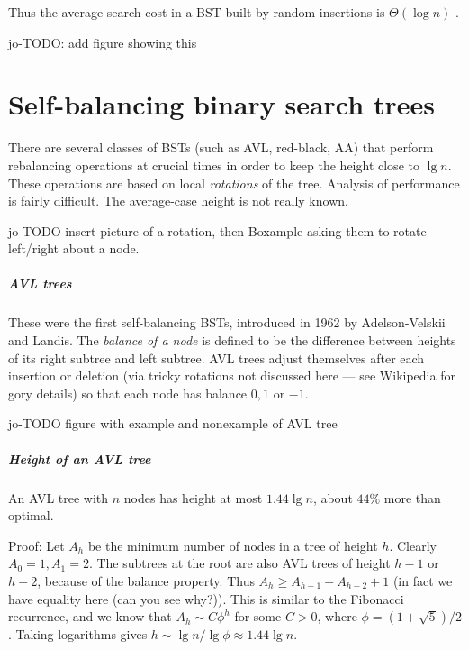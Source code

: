 Thus the average search cost in a BST built by random insertions is $\Theta(\log n)$ .

jo-TODO: add figure showing this





\chapter{Self-balancing binary search trees} %
\label{sec:balanced}

There are several classes of BSTs (such as AVL, red-black, AA) that 
perform rebalancing operations at crucial times in order to keep the height 
close to $\lg n$.
These operations are based on local \emph{rotations} of the tree.
Analysis of performance is fairly difficult.
The average-case height is not really known.

jo-TODO insert picture of a rotation, then Boxample asking them to rotate left/right about a node.

\paragraph{AVL trees}

These were the first self-balancing BSTs, introduced in 1962 by 
Adelson-Velskii and Landis. The \emph{balance of a node} is defined to be the difference between heights of its 
right subtree and left subtree. AVL trees adjust themselves after each insertion 
or deletion (via tricky rotations not discussed here --- see Wikipedia for gory details) so that each node has balance $0, 1$ or $-1$.

jo-TODO figure with example and nonexample of AVL tree


\paragraph{Height of an AVL tree}
\begin{Example}
An AVL tree with $n$ nodes has height at most $1.44 \lg n$, about $44\%$ more 
than optimal.

Proof: Let $A_h$ be the minimum number of nodes in a tree of height $h$. Clearly 
$A_0 = 1, A_1 = 2$. The subtrees at the root are also AVL trees of height $h-1$ or $h-2$, 
because of the balance property. Thus $A_h \geq A_{h-1} + A_{h-2} + 1$ (in fact we have equality here 
(can you see why?)). This is similar to the Fibonacci recurrence, and we know that 
$A_h \sim C \phi^h$ for some $C>0$, where $\phi = (1+\sqrt{5})/2$. 
Taking logarithms gives $h \sim \lg n / \lg \phi \approx 1.44 \lg n$. 
\end{Example}

